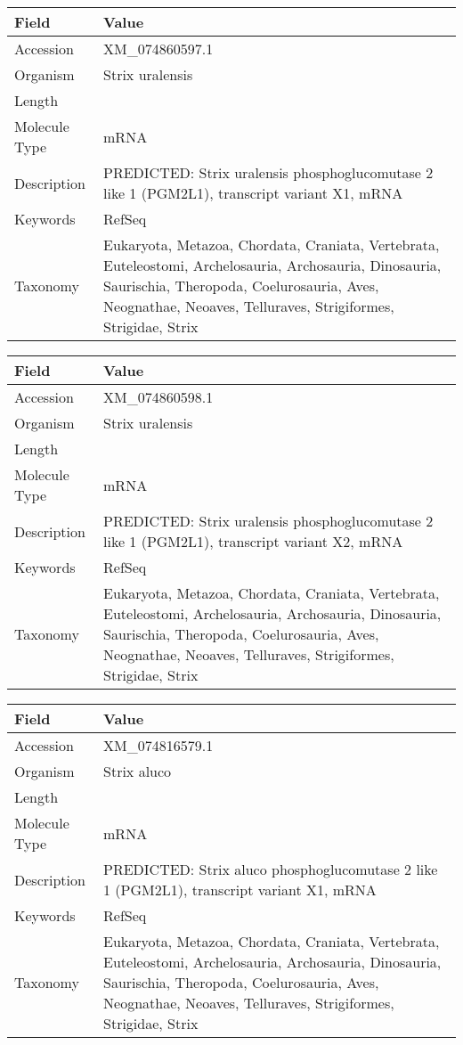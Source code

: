\documentclass[10pt]{article}
\begin{document}
{\footnotesize
\begin{longtable}{>{\raggedright\arraybackslash}p{4.5cm} >{\raggedright\arraybackslash}p{11.5cm}}
\textbf{Field} & \textbf{Value} \\
\hline
Accession & XM\_074860597.1 \\
Organism & Strix uralensis \\
Length & 6475 \\
Molecule Type & mRNA \\
Description & PREDICTED: Strix uralensis phosphoglucomutase 2 like 1 (PGM2L1), transcript variant X1, mRNA \\
Keywords & RefSeq \\
Taxonomy & Eukaryota, Metazoa, Chordata, Craniata, Vertebrata, Euteleostomi, Archelosauria, Archosauria, Dinosauria, Saurischia, Theropoda, Coelurosauria, Aves, Neognathae, Neoaves, Telluraves, Strigiformes, Strigidae, Strix \\
\end{longtable}
}

{\footnotesize
\begin{longtable}{>{\raggedright\arraybackslash}p{4.5cm} >{\raggedright\arraybackslash}p{11.5cm}}
\textbf{Field} & \textbf{Value} \\
\hline
Accession & XM\_074860598.1 \\
Organism & Strix uralensis \\
Length & 6282 \\
Molecule Type & mRNA \\
Description & PREDICTED: Strix uralensis phosphoglucomutase 2 like 1 (PGM2L1), transcript variant X2, mRNA \\
Keywords & RefSeq \\
Taxonomy & Eukaryota, Metazoa, Chordata, Craniata, Vertebrata, Euteleostomi, Archelosauria, Archosauria, Dinosauria, Saurischia, Theropoda, Coelurosauria, Aves, Neognathae, Neoaves, Telluraves, Strigiformes, Strigidae, Strix \\
\end{longtable}
}

{\footnotesize
\begin{longtable}{>{\raggedright\arraybackslash}p{4.5cm} >{\raggedright\arraybackslash}p{11.5cm}}
\textbf{Field} & \textbf{Value} \\
\hline
Accession & XM\_074816579.1 \\
Organism & Strix aluco \\
Length & 6473 \\
Molecule Type & mRNA \\
Description & PREDICTED: Strix aluco phosphoglucomutase 2 like 1 (PGM2L1), transcript variant X1, mRNA \\
Keywords & RefSeq \\
Taxonomy & Eukaryota, Metazoa, Chordata, Craniata, Vertebrata, Euteleostomi, Archelosauria, Archosauria, Dinosauria, Saurischia, Theropoda, Coelurosauria, Aves, Neognathae, Neoaves, Telluraves, Strigiformes, Strigidae, Strix \\
\end{longtable}
}
\end{document}
